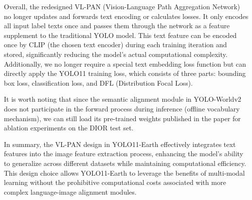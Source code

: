 \documentclass{article}
\begin{document}
Overall, the redesigned VL-PAN (Vision-Language Path Aggregation Network)
no longer updates and forwards text encoding or calculates losses.
It only encodes all input label texts once and passes them through the network
as a feature supplement to the traditional YOLO model. This text feature can
be encoded once by CLIP (the chosen text encoder) during each training iteration
and stored, significantly reducing the model’s actual computational complexity.
Additionally, we no longer require a special text embedding loss function but
can directly apply the YOLO11 training loss, which consists of three parts:
bounding box loss, classification loss, and DFL (Distribution Focal Loss).

It is worth noting that since the semantic alignment module in YOLO-Worldv2 does
not participate in the forward process during inference (offline vocabulary mechanism),
we can still load its pre-trained weights published in the paper for ablation experiments
on the DIOR test set.

In summary, the VL-PAN design in YOLO11-Earth effectively integrates text features into the
image feature extraction process, enhancing the model’s ability to generalize across
different datasets while maintaining computational efficiency. This design choice
allows YOLO11-Earth to leverage the benefits of multi-modal learning without the prohibitive
computational costs associated with more complex language-image alignment modules.
\end{document}
